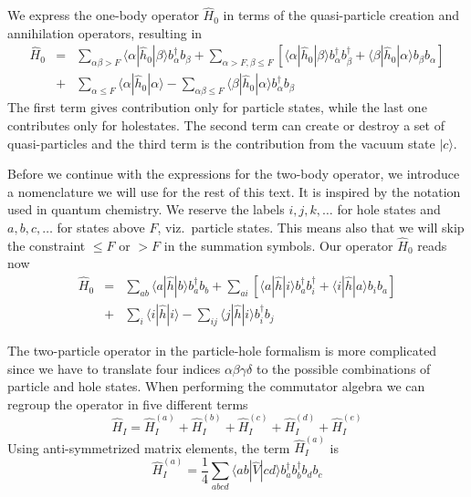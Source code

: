 We express the one-body operator $\hat{H}_0$ in terms of the quasi-particle creation and annihilation operators, resulting in
\begin{align}
	\hat{H}_0 &=& \sum_{\alpha\beta > F} \langle \alpha|\hat{h}_0|\beta\rangle  b_\alpha^\dagger b_\beta +
		\sum_{\alpha > F, \beta \leq F } \left[\langle \alpha|\hat{h}_0|\beta\rangle b_\alpha^\dagger b_\beta^\dagger + \langle \beta|\hat{h}_0|\alpha\rangle b_\beta  b_\alpha \right] \nonumber \\
	&+& \sum_{\alpha \leq F} \langle \alpha|\hat{h}_0|\alpha\rangle - \sum_{\alpha\beta \leq F} \langle \beta|\hat{h}_0|\alpha\rangle b_\alpha^\dagger b_\beta \label{eq:2-63b}
\end{align}
The first term  gives contribution only for particle states, while the last one
contributes only for holestates. The second term can create or destroy a set of
quasi-particles and 
the third term is the contribution  from the vacuum state $|c\rangle$.

Before we continue with the expressions for the two-body operator, we introduce a nomenclature we will use for the rest of this
text. It is inspired by the notation used in quantum chemistry.
We reserve the labels $i,j,k,\dots$ for hole states and $a,b,c,\dots$ for states above $F$, viz.~particle states.
This means also that we will skip the constraint $\leq F$ or $> F$ in the summation symbols. 
Our operator $\hat{H}_0$  reads now 
\begin{align}
	\hat{H}_0 &=& \sum_{ab} \langle a|\hat{h}|b\rangle b_a^\dagger b_b +
		\sum_{ai} \left[
		\langle a|\hat{h}|i\rangle b_a^\dagger b_i^\dagger + 
		\langle i|\hat{h}|a\rangle b_i  b_a \right] \nonumber \\
	&+& \sum_{i} \langle i|\hat{h}|i\rangle - 
		\sum_{ij} \langle j|\hat{h}|i\rangle
		b_i^\dagger b_j \label{eq:2-63c}
\end{align} 

The two-particle operator in the particle-hole formalism  is more complicated since we have
to translate four indices $\alpha\beta\gamma\delta$ to the possible combinations of particle and hole
states.  When performing the commutator algebra we can regroup the operator in five different terms
\begin{equation}
	\hat{H}_I = \hat{H}_I^{(a)} + \hat{H}_I^{(b)} + \hat{H}_I^{(c)} + \hat{H}_I^{(d)} + \hat{H}_I^{(e)} \label{eq:2-65}
\end{equation}
Using anti-symmetrized  matrix elements, 
the term  $\hat{H}_I^{(a)}$ is
\begin{equation}
	\hat{H}_I^{(a)} = \frac{1}{4}
	\sum_{abcd} \langle ab|\hat{V}|cd\rangle 
		b_a^\dagger b_b^\dagger b_d b_c \label{eq:2-66}
\end{equation}

